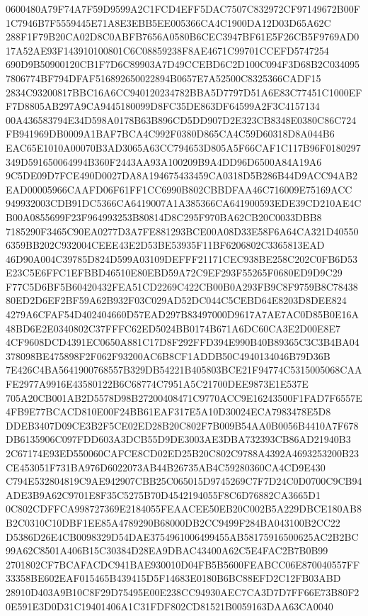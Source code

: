 \documentclass[UTF8,fontset=fandol,zihao=-4,a4paper]{ctexart}
\begin{document}
{{0600480A79F74A7F59D9599A2C1FCD4EFF5DAC7507C832972CF97149672B00F1C7946B7F5559445E71A8E3EBB5EE005366CA4C1900DA12D03D65A62C
288F1F79B20CA02D8C0ABFB7656A0580B6CEC3947BF61E5F26CB5F9769AD017A52AE93F143910100801C6C08859238F8AE4671C99701CCEFD5747254
690D9B50900120CB1F7D6C89903A7D49CCEBD6C2D100C094F3D68B2C0340957806774BF794DFAF516892650022894B0657E7A52500C8325366CADF15
2834C93200817BBC16A6CC940120234782BBA5D7797D51A6E83C77451C1000EFF7D8805AB297A9CA9445180099D8FC35DE863DF64599A2F3C4157134
00A436583794E34D598A0178B63B896CD5DD907D2E323CB8348E0380C86C724FB941969DB0009A1BAF7BCA4C992F0380D865CA4C59D60318D8A044B6
EAC65E1010A00070B3AD3065A63CC794653D805A5F66CAF1C117B96F0180297349D591650064994B360F2443AA93A100209B9A4DD96D6500A84A19A6
9C5DE09D7FCE490D0027DA8A194675433459CA0318D5B286B44D9ACC94AB2EAD00005966CAAFD06F61FF1CC6990B802CBBDFAA46C716009E75169ACC
949932003CDB91DC5366CA6419007A1A385366CA641900593EDE39CD210AE4CB00A0855699F23F964993253B80814D8C295F970BA62CB20C0033DBB8
7185290F3465C90EA0277D3A7FE881293BCE00A08D33E58F6A64CA321D405506359BB202C932004CEEE43E2D53BE53935F11BF6206802C3365813EAD
46D90A004C39785D824D599A03109DEFFF21171CEC938BE258C202C0FB6D53E23C5E6FFC1EFBBD46510E80EBD59A72C9EF293F55265F0680ED9D9C29
F77C5D6BF5B60420432FEA51CD2269C422CB00B0A293FB9C8F9759B8C7843880ED2D6EF2BF59A62B932F03C029AD52DC044C5CEBD64E8203D8DEE824
4279A6CFAF54D402404660D57EAD297B83497000D9617A7AE7AC0D85B0E16A48BD6E2E0340802C37FFFC62ED5024BB0174B671A6DC60CA3E2D00E8E7
4CF9608DCD4391EC0650A881C17D8F292FFD394E990B40B89365C3C3B4BA04378098BE475898F2F062F93200AC6B8CF1ADDB50C4940134046B79D36B
7E426C4BA5641900768557B329DB54221B405803BCE21F94774C5315005068CAAFE2977A9916E43580122B6C68774C7951A5C21700DEE9873E1E537E
705A20CB001AB2D5578D98B27200408471C9770ACC9E16243500F1FAD7F6557E4FB9E77BCACD810E00F24BB61EAF317E5A10D30024ECA7983478E5D8
DDEB3407D09CE3B2F5CE02ED28B20C802F7B009B54AA0B0056B4410A7F678DB6135906C097FDD603A3DCB55D9DE3003AE3DBA732393CB86AD21940B3
2C67174E93ED550060CAFCE8CD02ED25B20C802C9788A4392A4693253200B23CE453051F731BA976D6022073AB44B26735AB4C59280360CA4CD9E430
C794E532804819C9AE942907CBB25C065015D9745269C7F7D24C0D0700C9CB94ADE3B9A62C9701E8F35C5275B70D4542194055F8C6D76882CA3665D1
0C802CDFFCA998727369E2184055FEAACEE50EB20C002B5A229DBCE180AB8B2C0310C10DBF1EE85A4789290B68000DB2CC9499F284BA043100B2CC22
D5386D26E4CB0098329D54DAE3754961006499455AB58175916500625AC2B2BC99A62C8501A406B15C30384D28EA9DBAC43400A62C5E4FAC2B7B0B99
2701802CF7BCAFACDC941BAE930010D04FB5B5600FEABCC06E870040557FF33358BE602EAF015465B439415D5F14683E0180B6BC88EFD2C12FB03ABD
28910D403A9B10C8F29D75495E00E238CC94930AEC7CA3D7D7FF66E73B80F20E591E3D0D31C19401406A1C31FDF802CD81521B0059163DAA63CA0040
}}
\end{document}
